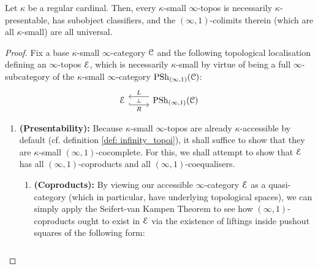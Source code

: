                 \begin{lemma} \label{lemma: building_infinity_topoi_out_of_colimits}
                    Let $\kappa$ be a regular cardinal. Then, every $\kappa$-small $\infty$-topos is necessarily $\kappa$-presentable, has subobject classifiers, and the $(\infty, 1)$-colimits therein (which are all $\kappa$-small) are all universal.
                \end{lemma}
                    \begin{proof}
                        Fix a base $\kappa$-small $\infty$-category $\C$ and the following topological localisation defining an $\infty$-topos $\E$, which is necessarily $\kappa$-small by virtue of being a full $\infty$-subcategory of the $\kappa$-small $\infty$-category $\Psh_{(\infty, 1)}(\C)$:
                            $$
                                \begin{tikzcd}
                                	\E & {\Psh_{(\infty, 1)}(\C)}
                                	\arrow[""{name=0, anchor=center, inner sep=0}, "L"', shift right=2, from=1-2, to=1-1]
                                	\arrow[""{name=1, anchor=center, inner sep=0}, "R"', shift right=2, hook, from=1-1, to=1-2]
                                	\arrow["\dashv"{anchor=center, rotate=-90}, draw=none, from=0, to=1]
                                \end{tikzcd}
                            $$
                        \begin{enumerate}
                            \item \textbf{(Presentability):} Because $\kappa$-small $\infty$-topos are already $\kappa$-accessible by default (cf. definition \ref{def: infinity_topoi}), it shall suffice to show that they are $\kappa$-small $(\infty, 1)$-cocomplete. For this, we shall attempt to show that $\E$ has all $(\infty, 1)$-coproducts and all $(\infty, 1)$-coequalisers. 
                                \begin{enumerate}
                                    \item \textbf{(Coproducts):} By viewing our accessible $\infty$-category $\E$ as a quasi-category (which in particular, have underlying topological spaces), we can simply apply the Seifert-van Kampen Theorem to see how $(\infty, 1)$-coproducts ought to exist in $\E$ via the existence of liftings inside pushout squares of the following form: 
                                        $$
                                            \begin{tikzcd}

\end{tikzcd}$$
\end{enumerate}
\end{enumerate}
\end{proof}
